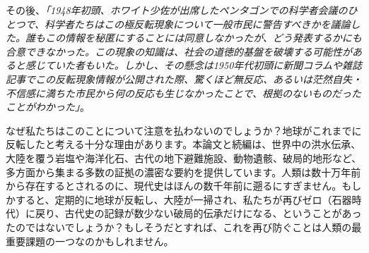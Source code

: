 \documentclass[10pt,twocolumn,letterpaper]{article}
\begin{document}
その後、\textit{「1948年初頭、ホワイト少佐が出席したペンタゴンでの科学者会議のひとつで、科学者たちはこの極反転現象について一般市民に警告すべきかを議論した。誰もこの情報を秘匿にすることには同意しなかったが、どう発表するかにも合意できなかった。この現象の知識は、社会の道徳的基盤を破壊する可能性があると感じていた者もいた。しかし、その懸念は1950年代初頭に新聞コラムや雑誌記事でこの反転現象情報が公開された際、驚くほど無反応、あるいは茫然自失・不信感に満ちた市民から何の反応も生じなかったことで、根拠のないものだったことがわかった」}\cite{138,139}。

なぜ私たちはこのことについて注意を払わないのでしょうか？地球がこれまでに反転したと考える十分な理由があります。本論文と続編は、世界中の洪水伝承、大陸を覆う岩塩や海洋化石、古代の地下避難施設、動物遺骸、破局的地形など、多方面から集まる多数の証拠の濃密な要約を提供しています。人類は数十万年前から存在するとされるのに、現代史はほんの数千年前に遡るにすぎません。もしかすると、定期的に地球が反転し、大陸が一掃され、私たちが再びゼロ（石器時代）に戻り、古代史の記録が数少ない破局的伝承だけになる、ということがあったのではないでしょうか？もしそうだとすれば、これを再び防ぐことは人類の最重要課題の一つなのかもしれません。
\end{document}
